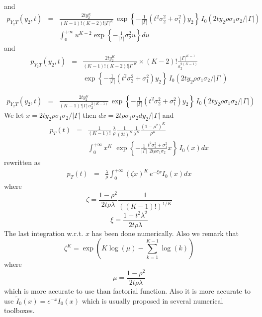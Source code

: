 and
\begin{eqnarray*}
p_{Y_{2}T}
 (y_{2},t)
 &=&\frac{2t y_{2}^{K}}{(K-1)!(K-2)!|\Gamma|^{K}}
 \,
 \exp\left\{
 -\frac{1}{|\Gamma|}(t^{2}\sigma_{2}^{2}+\sigma_{1}^{2})y_{2}\right\}
 \,
 I_{0}(2ty_{2}\rho\sigma_{1}\sigma_{2}/|\Gamma|)
 \\
 &&\int_{0}^{+\infty}
 u^{K-2} 
  \exp\left\{
 -\frac{1}{|\Gamma|} \sigma_{2}^{2}u
  \right\}du
 \end{eqnarray*}
and
\begin{eqnarray*}
p_{Y_{2}T}
 (y_{2},t)
 &=&\frac{2t y_{2}^{K}}{(K-1)!(K-2)!|\Gamma|^{K}}
 \times
 (K-2)!\frac{|\Gamma|^{K-1}}{\sigma_{2}^{2(K-1)}} 
 \\
 &&\exp\left\{
 -\frac{1}{|\Gamma|}(t^{2}\sigma_{2}^{2}+\sigma_{1}^{2})y_{2}\right\}
 \,
 I_{0}(2ty_{2}\rho\sigma_{1}\sigma_{2}/|\Gamma|)
\end{eqnarray*}

\begin{eqnarray*}
p_{Y_{2}T}
 (y_{2},t)
 &=&\frac{2t y_{2}^{K}}{(K-1)!|\Gamma|\, \sigma_{2}^{2(K-1)}}
 \,
 \exp\left\{
 -\frac{1}{|\Gamma|}(t^{2}\sigma_{2}^{2}+\sigma_{1}^{2})y_{2}\right\}
 \,
 I_{0}(2ty_{2}\rho\sigma_{1}\sigma_{2}/|\Gamma|)
\end{eqnarray*}
We let $x=2ty_{2}\rho\sigma_{1}\sigma_{2}/|\Gamma|$ then $dx=2t\rho\sigma_{1}\sigma_{2}dy_{2}/|\Gamma|$ and
\begin{eqnarray}
p_{T}(t)
 &=&\frac{1}{(K-1)!} \, \frac{\lambda}{\rho}
 \frac{1}{(2t)^{K}}\frac{1}{\lambda^{K}}\frac{(1-\rho^{2})^{K}}{\rho^{K}}
 \\
 && \nonumber
 \int_{0}^{+\infty}x^{K} \,
  \,
 \exp\left\{
 -\frac{1}{|\Gamma|}
 \frac{t^{2}\sigma_{2}^{2}+\sigma_{1}^{2}}{2t\rho\sigma_{1}\sigma_{2}}x\right\}
 \,
 I_{0}(x)dx
\end{eqnarray}
rewritten as
\begin{eqnarray}
 \label{eq:RonA2distribution}
p_{T}(t)
 &=&\frac{\lambda}{\rho}
 \int_{0}^{+\infty}(\zeta x)^{K} \,e^{-\xi x}I_{0}(x)dx
\end{eqnarray}
where
$$
 \zeta = \frac{1-\rho^{2}}{2t\rho\lambda}\frac{1}{((K-1)!)^{1/K}}
$$
$$
 \xi = \frac{1+t^{2}\lambda^{2}}{2t\rho\lambda}
$$
The last integration w.r.t. $x$ has been done numerically. Also we remark that
$$
 \zeta^{K} = \exp\left(
 K \log(\mu)-\sum_{k=1}^{K-1} \log(k)
 \right)
$$
where
$$
 \mu = \frac{1-\rho^{2}}{2t\rho\lambda}
$$
which is more accurate to use than factorial function. Also it is more accurate to use
$\tilde I_{0}(x)=e^{-x}I_{0}(x)$ which is usually proposed in several numerical toolboxes.


